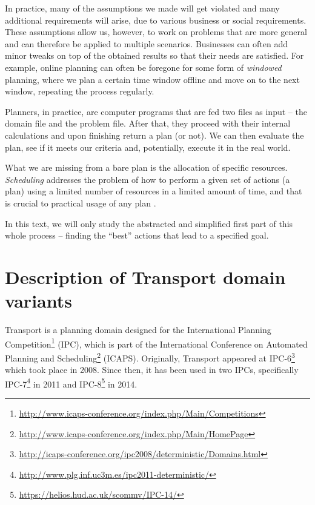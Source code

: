 In practice, many of the assumptions we made will get violated and many additional requirements will arise,
due to various business or social requirements.
These assumptions allow us, however, to work
on problems that are more general and can therefore be applied to multiple scenarios.
Businesses can often add minor tweaks on top of the obtained results so that
their needs are satisfied. 
For example, online planning can often be foregone for some form of \textit{windowed} planning,
where we plan a certain time window offline and move on to the next window,
repeating the process regularly.

Planners, in practice, are computer programs that are fed two files as input
-- the domain file and the problem file. After that, they proceed with their internal calculations
and upon finishing return a plan (or not). 
We can then evaluate the plan, see if it meets our criteria and, potentially,
execute it in the real world.

What we are missing from a bare plan is the allocation of specific resources.
\textit{Scheduling} addresses the problem of how to perform a given set of actions (a plan)
using a limited number of resources in a limited amount of time, and
that is crucial to practical usage of any plan \citep[Chapter~15]{Ghallab2004}.

In this text, we will only study the abstracted and simplified first part of this whole process
-- finding the ``best'' actions that lead to a specified goal.


















\section{Description of Transport domain variants}

Transport is a planning domain designed for
the International Planning
Competition\footnote{\url{http://www.icaps-conference.org/index.php/Main/Competitions}}
(IPC), which is part of the International Conference on Automated Planning and
Scheduling\footnote{\url{http://www.icaps-conference.org/index.php/Main/HomePage}} (ICAPS).
Originally, Transport appeared at 
IPC-6\footnote{\url{http://icaps-conference.org/ipc2008/deterministic/Domains.html}} which took place in 2008.
Since then, it has been used in two IPCs,
specifically IPC-7\footnote{\url{http://www.plg.inf.uc3m.es/ipc2011-deterministic/}} in 2011
and IPC-8\footnote{\url{https://helios.hud.ac.uk/scommv/IPC-14/}} in 2014.


